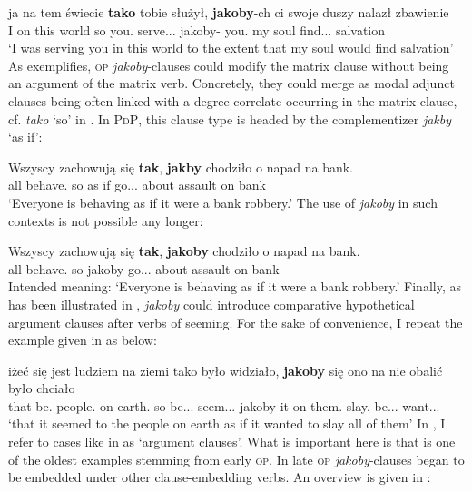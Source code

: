 \documentclass[output=paper
,modfonts
,nonflat]{langsci/langscibook}
\begin{document}
\ea \gll ja na tem świecie \textbf{tako} tobie służył, \textbf{jakoby}-ch ci swoje duszy nalazł zbawienie \label{adjunct-jakoby} \\
		I on this world so you.{\dat} serve.{\lptcp}.{\sg}.{\masc} jakoby-{\aor} you.{\dat} my soul find.{\lptcp}.{\sg}.{\masc} salvation \\
\glt	`I was serving you in this world to the extent that my soul would find salvation'  
\z
As  exemplifies, \textsc{op} \emph{jakoby}-clauses could modify the matrix clause without being an argument of the matrix verb. Concretely, they could merge as modal adjunct clauses being often linked with a degree correlate occurring in the matrix clause, cf. \emph{tako} `so' in . In \textsc{PdP}, this clause type is headed by the complementizer \emph{jakby} `as if':

\ea \gll Wszyscy zachowują się \textbf{tak}, \textbf{jakby} chodziło o napad na bank. \\
		all behave.{\thirdperson}{\pl} {} so {as if} go.{\lptcp}.{\sg}.{\n} about assault on bank \\
\glt	`Everyone is behaving as if it were a bank robbery.'  
\z
The use of \emph{jakoby} in such contexts is not possible any longer: 

\ea \gll *Wszyscy zachowują się \textbf{tak}, \textbf{jakoby} chodziło o napad na bank. \\
		all behave.{\thirdperson}{\pl} {} so jakoby go.{\lptcp}.{\sg}.{\n} about assault on bank \\
\glt	Intended meaning: `Everyone is behaving as if it were a bank robbery.'
\z
Finally, as has been illustrated in , \emph{jakoby} could introduce comparative hypothetical argument clauses after verbs of seeming. For the sake of convenience, I repeat the example given in  as  below:  

\ea \gll iżeć się jest ludziem na ziemi tako było widziało, \textbf{jakoby} się ono na nie obalić było chciało \label{tee2} \\
			that {} be.{\thirdperson}{\sg} people.{\dat} on earth.{\loc} so be.{\lptcp}.{\sg}.{\n} seem.{\lptcp}.{\sg}.{\n} jakoby {} it on them.{\acc} slay.{\infv} be.{\lptcp}.{\sg}.{\n} want.{\lptcp}.{\sg}.{\n} \\
\glt	`that it seemed to the people on earth as if it wanted to slay all of them' 	
\z
In , I refer to cases like in   as `argument clauses'. What is important here is that  is one of the oldest examples stemming from early \textsc{op}. In late \textsc{op} \emph{jakoby}-clauses began to be embedded under other clause-embedding verbs. An overview is given in : 
\end{document}
